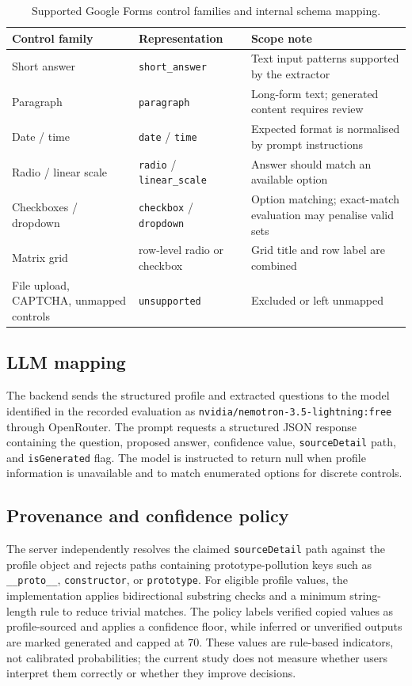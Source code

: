 \documentclass[]{einformatica}
\begin{document}
\begin{table}[h]
\caption{Supported Google Forms control families and internal schema mapping.}
\label{tab:controls}
\begin{tabularx}{\textwidth}{llX}
\toprule
\textbf{Control family} & \textbf{Representation} & \textbf{Scope note} \\
\midrule
Short answer & \texttt{short\_answer} & Text input patterns supported by the extractor \\
Paragraph & \texttt{paragraph} & Long-form text; generated content requires review \\
Date / time & \texttt{date} / \texttt{time} & Expected format is normalised by prompt instructions \\
Radio / linear scale & \texttt{radio} / \texttt{linear\_scale} & Answer should match an available option \\
Checkboxes / dropdown & \texttt{checkbox} / \texttt{dropdown} & Option matching; exact-match evaluation may penalise valid sets \\
Matrix grid & row-level radio or checkbox & Grid title and row label are combined \\
File upload, CAPTCHA, unmapped controls & \texttt{unsupported} & Excluded or left unmapped \\
\bottomrule
\end{tabularx}
\end{table}

\subsection{LLM mapping}
The backend sends the structured profile and extracted questions to the model identified in the recorded evaluation as \texttt{nvidia/nemotron-3.5-lightning:free} through OpenRouter. The prompt requests a structured JSON response containing the question, proposed answer, confidence value, \texttt{sourceDetail} path, and \texttt{isGenerated} flag. The model is instructed to return null when profile information is unavailable and to match enumerated options for discrete controls.

\subsection{Provenance and confidence policy}
The server independently resolves the claimed \texttt{sourceDetail} path against the profile object and rejects paths containing prototype-pollution keys such as \texttt{\_\_proto\_\_}, \texttt{constructor}, or \texttt{prototype}. For eligible profile values, the implementation applies bidirectional substring checks and a minimum string-length rule to reduce trivial matches. The policy labels verified copied values as profile-sourced and applies a confidence floor, while inferred or unverified outputs are marked generated and capped at 70. These values are rule-based indicators, not calibrated probabilities; the current study does not measure whether users interpret them correctly or whether they improve decisions.
\end{document}
